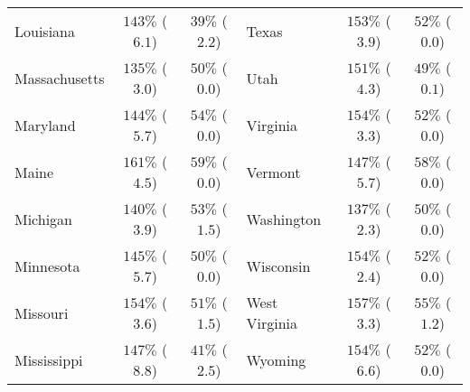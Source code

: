\begin{tabular}{lcclcc}
Louisiana & $143\%$ ($6.1$)  & $39\%$ ($2.2$)  & Texas & $153\%$ ($3.9$)  & $52\%$ ($0.0$)  \\ 
Massachusetts & $135\%$ ($3.0$)  & $50\%$ ($0.0$)  & Utah & $151\%$ ($4.3$)  & $49\%$ ($0.1$)  \\ 
Maryland & $144\%$ ($5.7$)  & $54\%$ ($0.0$)  & Virginia & $154\%$ ($3.3$)  & $52\%$ ($0.0$)  \\ 
Maine & $161\%$ ($4.5$)  & $59\%$ ($0.0$)  & Vermont & $147\%$ ($5.7$)  & $58\%$ ($0.0$)  \\ 
Michigan & $140\%$ ($3.9$)  & $53\%$ ($1.5$)  & Washington & $137\%$ ($2.3$)  & $50\%$ ($0.0$)  \\ 
Minnesota & $145\%$ ($5.7$)  & $50\%$ ($0.0$)  & Wisconsin & $154\%$ ($2.4$)  & $52\%$ ($0.0$)  \\ 
Missouri & $154\%$ ($3.6$)  & $51\%$ ($1.5$)  & West Virginia & $157\%$ ($3.3$)  & $55\%$ ($1.2$)  \\ 
Mississippi & $147\%$ ($8.8$)  & $41\%$ ($2.5$)  & Wyoming & $154\%$ ($6.6$)  & $52\%$ ($0.0$)  \\ 
\bottomrule
\end{tabular}

